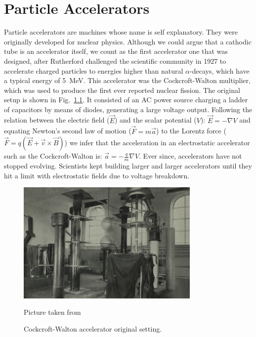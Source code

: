 
\chapter{Particle Accelerators}
\label{c:accel} %
Particle accelerators are machines whose name is self explanatory. They were
originally developed for nuclear physics. Although we could argue that a
cathodic tube is an accelerator itself, we count as the first accelerator one
that was designed, after Rutherford challenged the scientific community in 1927
to accelerate charged particles to energies higher than natural
$\alpha$-decays\cite{Steere2005timeline}, which have a typical energy of
\SI{5}{MeV}. This accelerator was the Cockcroft-Walton multiplier, which was used to produce the first ever reported nuclear fission. The original setup
is shown in Fig.~\ref{fig:cock}. It consisted of an AC power source charging a
ladder of capacitors by means of diodes, generating a large voltage
output\cite{Cockcroft619}. Following the relation between the electric field
($\vec{E}$) and the scalar potential ($V$): $\vec{E}=-\nabla{V}$ and equating
Newton's second law of motion ($\vec{F}=m\vec{a}$) to the Lorentz force
($\vec{F}=q(\vec{E}+\vec{v}\times\vec{B})$) we infer that the acceleration in an
electrostatic accelerator such as the Cockcroft-Walton is:
$\vec{a}=-\frac{q}{m}\nabla{}V$. Ever since, accelerators have not stopped
evolving. Scientists kept building larger and larger accelerators until they hit
a limit with electrostatic fields due to voltage breakdown\cite{EASTHAM198410}.
\begin{figure}
	\centering
  \begin{minipage}{\textwidth}
  	\centering
   	\includegraphics[width=3.5in]{Pictures/cockroft.jpg}
  		\caption{\label{fig:cock}
   			Cockcroft-Walton accelerator original setting.}
   			\footnotesize{Picture taken from \citep{Cockcroft619}}
   \end{minipage}
\end{figure}

